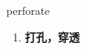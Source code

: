 
\begin{frame}
{\huge perforate}
\begin{center}
\begin{enumerate}\Large
  \item \textbf{打孔，穿透}
\end{enumerate}
\end{center}
\end{frame}
